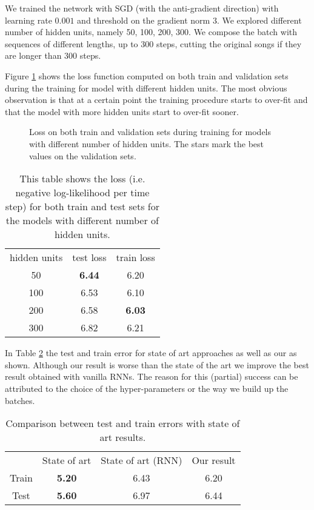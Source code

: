 We trained the network with SGD (with the anti-gradient direction) with learning rate $0.001$ and threshold on the gradient norm $3$. We explored different number of hidden units, namely 50, 100, 200, 300. We compose the batch with sequences of different lengths, up to 300 steps, cutting the original songs if they are longer than 300 steps.

Figure \ref{fig:overfitting_muse} shows the loss function computed on both train and validation sets during the training for model with different hidden units. The most obvious observation is that at a certain point the training procedure starts to over-fit and that the model with more hidden units start to over-fit sooner.

\begin{figure}
	\centering
\resizebox{13cm}{!}{
	
}
\caption{Loss on both train and validation sets during training for models with different number of hidden units. The stars mark the best values on the validation sets.}
\label{fig:overfitting_muse}
\end{figure}

\begin{table}
	\centering
\begin{tabular}{c | c | c}
	hidden units & test loss & train loss \\
	50 & \textbf{6.44} & 6.20  \\
	100 & 6.53 & 6.10 \\
	200 & 6.58 & \textbf{6.03} \\
	300 & 6.82 & 6.21 \\
\end{tabular}
\caption{This table shows the loss (i.e. negative log-likelihood per time step) for both train and test sets for the models with different number of hidden units.}
\label{table:losses_n_hidden}
\end{table}

In Table \ref{table:muse_state_of_art} the test and train error for state of art approaches as well as our as shown. Although our result is worse than the state of the art we improve the best result obtained with vanilla RNNs. The reason for this (partial) success can be attributed to the choice of the hyper-parameters or the way we build up the batches.

\begin{table}
	\centering
	\begin{tabular}{c | c | c | c}
		& State of art & State of art (RNN) & Our result\\
		Train & \textbf{5.20} & 6.43 & 6.20\\
		Test & \textbf{5.60} & 6.97 & 6.44\\
	\end{tabular}
	\caption{Comparison between test and train errors with state of art results.}
	\label{table:muse_state_of_art}
	
\end{table}

